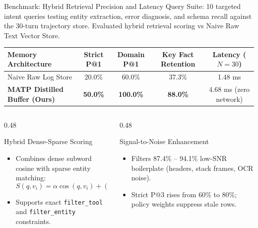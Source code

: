 \documentclass[aspectratio=169,10pt]{beamer}
\begin{document}
\begin{frame}{Benchmark: Hybrid Retrieval Precision and Latency}
  {\footnotesize Query Suite: 10 targeted intent queries testing entity extraction, error diagnosis, and schema recall against the 30-turn trajectory store. Evaluated hybrid retrieval scoring vs Naive Raw Text Vector Store.}

  \vspace{0.3em}
  \begin{table}
    \centering
    \footnotesize
    \begin{tabular}{lcccc}
      \toprule
      Memory Architecture & Strict P@1 & Domain P@1 & Key Fact Retention & Latency ($N=30$)\\
      \midrule
      Naive Raw Log Store & 20.0\% & 60.0\% & 37.3\% & 1.48 ms\\
      \textbf{MATP Distilled Buffer (Ours)} & \textbf{50.0\%} & \textbf{100.0\%} & \textbf{88.0\%} & 4.68 ms (zero network)\\
      \bottomrule
    \end{tabular}
  \end{table}

  \begin{columns}[T,onlytextwidth]
    \begin{column}{0.48\textwidth}
      \begin{block}{Hybrid Dense-Sparse Scoring}
        \begin{itemize}
          \footnotesize
          \item Combines dense subword cosine with sparse entity matching:
            \[
              S(q, v_i) = \alpha \cos(q, v_i) + (1-\alpha) \mathrm{Overlap}(q, G_i)
            \]
          \item Supports exact \texttt{filter\_tool} and \texttt{filter\_entity} constraints.
        \end{itemize}
      \end{block}
    \end{column}
    \begin{column}{0.48\textwidth}
      \begin{block}{Signal-to-Noise Enhancement}
        \begin{itemize}
          \footnotesize
          \item Filters 87.4\% -- 94.1\% low-SNR boilerplate (headers, stack frames, OCR noise).
          \item Strict P@3 rises from 60\% to 80\%; policy weights suppress stale rows.
        \end{itemize}
      \end{block}
    \end{column}
  \end{columns}
\end{frame}
\end{document}
